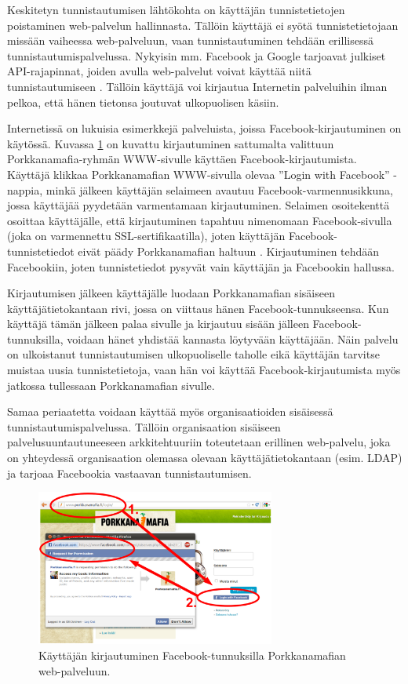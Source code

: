 Keskitetyn tunnistautumisen lähtökohta on käyttäjän tunnistetietojen poistaminen web-palvelun hallinnasta. Tällöin käyttäjä ei syötä tunnistetietojaan missään vaiheessa web-palveluun, vaan tunnistautuminen tehdään erillisessä tunnistautumispalvelussa. Nykyisin mm. Facebook ja Google tarjoavat julkiset API-rajapinnat, joiden avulla web-palvelut voivat käyttää niitä tunnistautumiseen \cite{facebook}. Tällöin käyttäjä voi kirjautua Internetin palveluihin ilman pelkoa, että hänen tietonsa joutuvat ulkopuolisen käsiin.

Internetissä on lukuisia esimerkkejä palveluista, joissa Facebook-kirjautuminen on käytössä. Kuvassa \ref{facebook_login} on kuvattu kirjautuminen sattumalta valittuun Porkkanamafia-ryhmän WWW-sivulle käyttäen Facebook-kirjautumista. Käyttäjä klikkaa Porkkanamafian WWW-sivulla olevaa ''Login with Facebook'' -nappia, minkä jälkeen käyttäjän selaimeen avautuu Facebook-varmennusikkuna, jossa käyttäjää pyydetään varmentamaan kirjautuminen. Selaimen osoitekenttä osoittaa käyttäjälle, että kirjautuminen tapahtuu nimenomaan Facebook-sivulla (joka on varmennettu SSL-sertifikaatilla), joten käyttäjän Facebook-tun\-nis\-te\-tie\-dot eivät päädy Porkkanamafian haltuun \cite{facebook}. Kirjautuminen tehdään Facebookiin, joten tunnistetiedot pysyvät vain käyttäjän ja Facebookin hallussa.

Kirjautumisen jälkeen käyttäjälle luodaan Porkkanamafian sisäiseen käyttäjätietokantaan rivi, jossa on viittaus hänen Facebook-tunnukseensa. Kun käyttäjä tämän jälkeen palaa sivulle ja kirjautuu sisään jälleen Facebook-tunnuksilla, voidaan hänet yhdistää kannasta löytyvään käyttäjään. Näin palvelu on ulkoistanut tunnistautumisen ulkopuoliselle taholle eikä käyttäjän tarvitse muistaa uusia tunnistetietoja, vaan hän voi käyttää Facebook-kirjautumista myös jatkossa tullessaan Porkkanamafian sivulle.

Samaa periaatetta voidaan käyttää myös organisaatioiden sisäisessä tunnistautumispalvelussa. Tällöin organisaation sisäiseen palvelusuuntautuneeseen arkkitehtuuriin toteutetaan erillinen web-palvelu, joka on yhteydessä organisaation olemassa olevaan käyttäjätietokantaan (esim. LDAP) ja tarjoaa Facebookia vastaavan tunnistautumisen.

\begin{figure}[ht]
\centering
\includegraphics[width=0.7\textwidth]{tunnistautuminen/keskitetty/facebook.eps}
\caption{Käyttäjän kirjautuminen Facebook-tunnuksilla Porkkanamafian web-palveluun.}%
\label{facebook_login}
\end{figure}